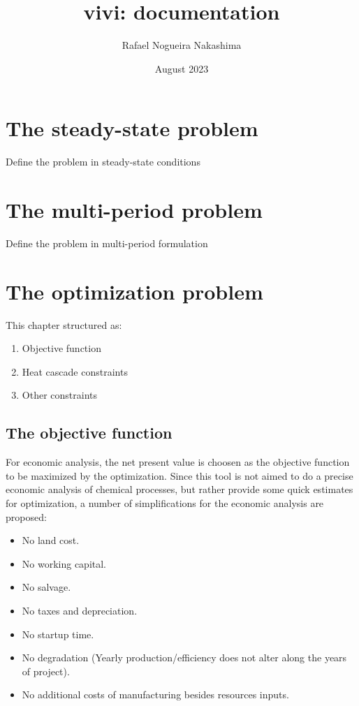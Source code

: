 \documentclass[10pt,twoside,a4paper]{report}
\begin{document}
\title{vivi: documentation}
\author{Rafael Nogueira Nakashima}
\date{August 2023}

\maketitle


\chapter{The steady-state problem}

Define the problem in steady-state conditions

\chapter{The multi-period problem}

Define the problem in multi-period formulation

\chapter{The optimization problem}

This chapter structured as:
\begin{enumerate}
\item Objective function
\item Heat cascade constraints
\item Other constraints
\end{enumerate}

\section{The objective function}
For economic analysis, the net present value is choosen as the
objective function to be maximized by the optimization. Since this
tool is not aimed to do a precise economic analysis of chemical
processes, but rather provide some quick estimates for optimization, a
number of simplifications for the economic analysis are proposed:

\begin{itemize}
\item No land cost.
\item No working capital.
\item No salvage.
\item No taxes and depreciation.
\item No startup time.
\item No degradation (Yearly production/efficiency does not alter along the years of project).
\item No additional costs of manufacturing besides resources inputs.
\end{itemize}
\end{document}

